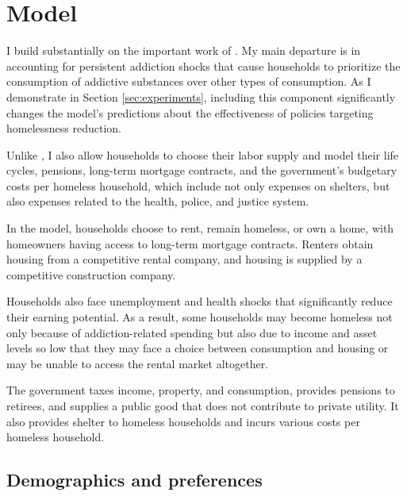 \documentclass[parskip=full]{article}
\begin{document}

\section{Model}\label{sec:model}

I build substantially on the important work of \citet{az-2024}. My main departure is in accounting for persistent addiction shocks that cause households to prioritize the consumption of addictive substances over other types of consumption. As I demonstrate in Section \ref{sec:experiments}, including this component significantly changes the model's predictions about the effectiveness of policies targeting homelessness reduction.

Unlike \citet{az-2024}, I also allow households to choose their labor supply and model their life cycles, pensions, long-term mortgage contracts, and the government’s budgetary costs per homeless household, which include not only expenses on shelters, but also expenses related to the health, police, and justice system.

In the model, households choose to rent, remain homeless, or own a home, with homeowners having access to long-term mortgage contracts. Renters obtain housing from a competitive rental company, and housing is supplied by a competitive construction company.

Households also face unemployment and health shocks that significantly reduce their earning potential. As a result, some households may become homeless not only because of addiction-related spending but also due to income and asset levels so low that they may face a choice between consumption and housing or may be unable to access the rental market altogether.

The government taxes income, property, and consumption, provides pensions to retirees, and supplies a public good that does not contribute to private utility. It also provides shelter to homeless households and incurs various costs per homeless household.

\subsection{Demographics and preferences}
\end{document}
